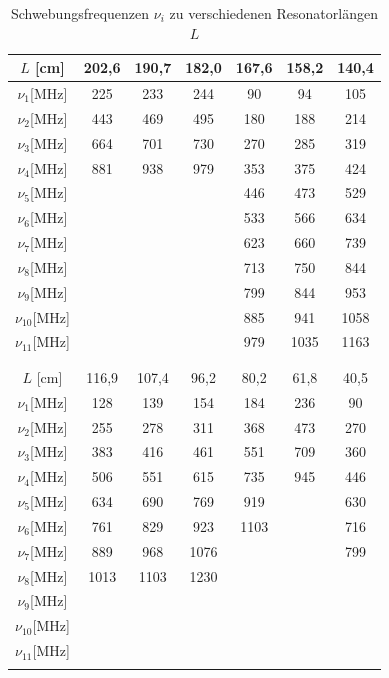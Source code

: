 \begin{table}
\centering
\caption{Schwebungsfrequenzen $\nu_i$ zu verschiedenen Resonatorlängen $L$}
\begin{tabular}{c c c c c c c}
\toprule
$L$ [cm]	&	202,6	&	190,7	&	182,0	&	167,6	&	158,2	&	140,4	\\
\midrule
$\nu_1$[MHz]	&	225	&	233	&	244	&	90	&	94	&	105	\\
$\nu_2$[MHz]	&	443	&	469	&	495	&	180	&	188	&	214	\\
$\nu_3$[MHz]	&	664	&	701	&	730	&	270	&	285	&	319	\\
$\nu_4$[MHz]	&	881	&	938	&	979	&	353	&	375	&	424	\\
$\nu_5$[MHz]	&		&		&		&	446	&	473	&	529	\\
$\nu_6$[MHz]	&		&		&		&	533	&	566	&	634	\\
$\nu_7$[MHz]	&		&		&		&	623	&	660	&	739	\\
$\nu_8$[MHz]	&		&		&		&	713	&	750	&	844	\\
$\nu_9$[MHz]	&		&		&		&	799	&	844	&	953	\\
$\nu_{10}$[MHz]	&		&		&		&	885	&	941	&	1058	\\
$\nu_{11}$[MHz]	&		&		&		&	979	&	1035	&	1163	\\
&		&		&		&		&		&\\
											\midrule		
&		&		&		&		&		&\\		
$L$ [cm]	&	116,9	&	107,4	&	96,2	&	80,2	&	61,8	&	40,5	\\
\midrule
$\nu_1$[MHz]	&	128	&	139	&	154	&	184	&	236	&	90	\\
$\nu_2$[MHz]	&	255	&	278	&	311	&	368	&	473	&	270	\\
$\nu_3$[MHz]	&	383	&	416	&	461	&	551	&	709	&	360	\\
$\nu_4$[MHz]	&	506	&	551	&	615	&	735	&	945	&	446	\\
$\nu_5$[MHz]	&	634	&	690	&	769	&	919	&		&	630	\\
$\nu_6$[MHz]	&	761	&	829	&	923	&	1103	&		&	716	\\
$\nu_7$[MHz]	&	889	&	968	&	1076	&		&		&	799	\\
$\nu_8$[MHz]	&	1013	&	1103	&	1230	&		&		&		\\
$\nu_9$[MHz]	&		&		&		&		&		&		\\
$\nu_{10}$[MHz]	&		&		&		&		&		&		\\
$\nu_{11}$[MHz]	&		&		&		&		&		&		\\

\bottomrule
\label{tab:Multimoden}
\end{tabular}
\end{table}


